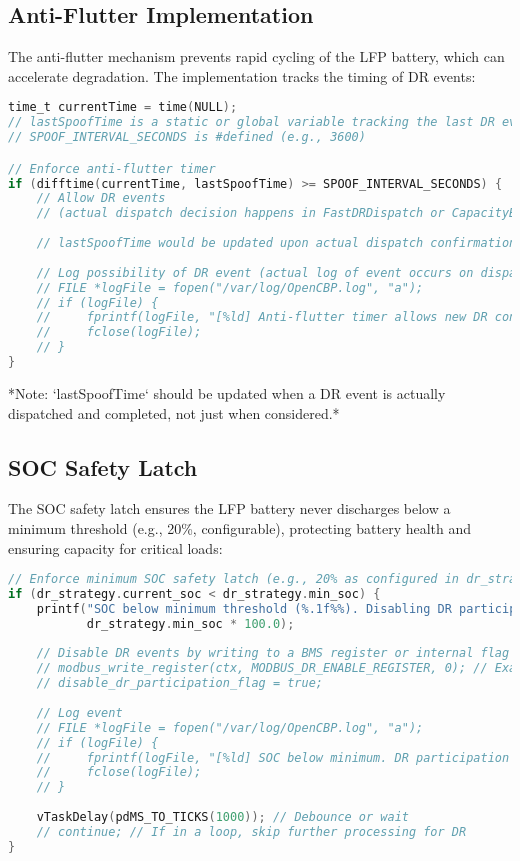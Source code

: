 \documentclass[11pt,a4paper]{article}
\begin{document}
\subsection{Anti-Flutter Implementation}
The anti-flutter mechanism prevents rapid cycling of the LFP battery, which can accelerate degradation. The implementation tracks the timing of DR events:

\begin{lstlisting}[language=C, caption=Anti-Flutter Timer Implementation (Conceptual Snippet from `SpoofSOC` Task), label=lst:anti-flutter]
time_t currentTime = time(NULL);
// lastSpoofTime is a static or global variable tracking the last DR event dispatch
// SPOOF_INTERVAL_SECONDS is #defined (e.g., 3600)

// Enforce anti-flutter timer
if (difftime(currentTime, lastSpoofTime) >= SPOOF_INTERVAL_SECONDS) {
    // Allow DR events 
    // (actual dispatch decision happens in FastDRDispatch or CapacityBidding)
    
    // lastSpoofTime would be updated upon actual dispatch confirmation
    
    // Log possibility of DR event (actual log of event occurs on dispatch)
    // FILE *logFile = fopen("/var/log/OpenCBP.log", "a");
    // if (logFile) {
    //     fprintf(logFile, "[%ld] Anti-flutter timer allows new DR consideration.\n", currentTime);
    //     fclose(logFile);
    // }
}
\end{lstlisting}
*Note: `lastSpoofTime` should be updated when a DR event is actually dispatched and completed, not just when considered.*

\subsection{SOC Safety Latch}
The SOC safety latch ensures the LFP battery never discharges below a minimum threshold (e.g., 20\%, configurable), protecting battery health and ensuring capacity for critical loads:

\begin{lstlisting}[language=C, caption=SOC Safety Latch Implementation (Snippet from `SpoofSOC` Task), label=lst:soc-safety]
// Enforce minimum SOC safety latch (e.g., 20% as configured in dr_strategy.min_soc)
if (dr_strategy.current_soc < dr_strategy.min_soc) {
    printf("SOC below minimum threshold (%.1f%%). Disabling DR participation.\n", 
           dr_strategy.min_soc * 100.0);
           
    // Disable DR events by writing to a BMS register or internal flag
    // modbus_write_register(ctx, MODBUS_DR_ENABLE_REGISTER, 0); // Example
    // disable_dr_participation_flag = true;
    
    // Log event
    // FILE *logFile = fopen("/var/log/OpenCBP.log", "a");
    // if (logFile) {
    //     fprintf(logFile, "[%ld] SOC below minimum. DR participation disabled.\n", currentTime);
    //     fclose(logFile);
    // }
    
    vTaskDelay(pdMS_TO_TICKS(1000)); // Debounce or wait
    // continue; // If in a loop, skip further processing for DR
}
\end{lstlisting}
\end{document}

